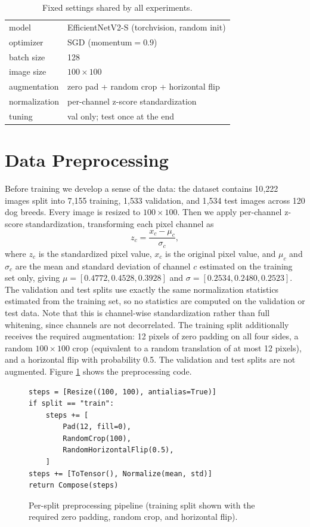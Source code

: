 \documentclass[letterpaper]{article} %
\begin{document}
\begin{table}[tb]
\centering
\small
\begin{tabular}{ll}
\hline
model & EfficientNetV2-S (torchvision, random init) \\
optimizer & SGD (momentum$=0.9$) \\
batch size & 128 \\
image size & $100\times100$ \\
augmentation & zero pad + random crop + horizontal flip \\
normalization & per-channel z-score standardization \\
tuning & val only; test once at the end \\
\hline
\end{tabular}
\caption{Fixed settings shared by all experiments.}
\label{tab:setup}
\end{table}

\section{Data Preprocessing}

Before training we develop a sense of the data: the dataset contains 10{,}222
images split into 7{,}155 training, 1{,}533 validation, and 1{,}534 test
images across 120 dog breeds.  Every image is resized to $100\times100$.  Then
we apply per-channel z-score standardization, transforming each pixel channel
as
\[
z_c = \frac{x_c - \mu_c}{\sigma_c},
\]
where $z_c$ is the standardized pixel value, $x_c$ is the original pixel
value, and $\mu_c$ and $\sigma_c$ are the mean and standard deviation of
channel $c$ estimated on the training set only, giving
$\mu=[0.4772,0.4528,0.3928]$ and $\sigma=[0.2534,0.2480,0.2523]$.  The
validation and test splits use exactly the same normalization statistics
estimated from the training set, so no statistics are computed on the
validation or test data.  Note that this is channel-wise standardization
rather than full whitening, since channels are not decorrelated.
The training split additionally receives the required augmentation: 12 pixels
of zero padding on all four sides, a random $100\times100$ crop (equivalent to
a random translation of at most 12 pixels), and a horizontal flip with
probability 0.5.  The validation and test splits are not augmented.  Figure
\ref{lst:aug} shows the preprocessing code.

\begin{figure}[tb]
\centering
\begin{minipage}{0.92\columnwidth}
\scriptsize\ttfamily
\begin{verbatim}
steps = [Resize((100, 100), antialias=True)]
if split == "train":
    steps += [
        Pad(12, fill=0),
        RandomCrop(100),
        RandomHorizontalFlip(0.5),
    ]
steps += [ToTensor(), Normalize(mean, std)]
return Compose(steps)
\end{verbatim}
\end{minipage}
\caption{Per-split preprocessing pipeline (training split shown with the
required zero padding, random crop, and horizontal flip).}
\label{lst:aug}
\end{figure}
\end{document}
